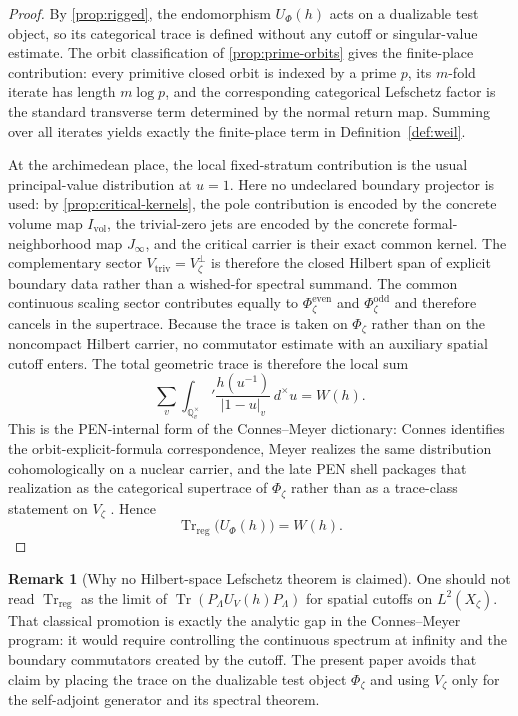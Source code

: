 \documentclass[11pt,a4paper]{article}
\theoremstyle{plain}
\theoremstyle{definition}
\newtheorem{remark}[theorem]{Remark}
\newcommand{\Q}{\mathbb{Q}}
\newcommand{\Tr}{\operatorname{Tr}}
\newcommand{\Trreg}{\operatorname{Tr}_{\mathrm{reg}}}
\newcommand{\triv}{\mathrm{triv}}
\newcommand{\dmu}{d^{\times}}
\begin{document}
\begin{proof}
By \cref{prop:rigged}, the endomorphism $U_{\Phi}(h)$ acts on a dualizable test object, so its categorical trace is defined without any cutoff or singular-value estimate. The orbit classification of \cref{prop:prime-orbits} gives the finite-place contribution: every primitive closed orbit is indexed by a prime $p$, its $m$-fold iterate has length $m\log p$, and the corresponding categorical Lefschetz factor is the standard transverse term determined by the normal return map. Summing over all iterates yields exactly the finite-place term in Definition~\ref{def:weil}.

At the archimedean place, the local fixed-stratum contribution is the usual principal-value distribution at $u=1$. Here no undeclared boundary projector is used: by \cref{prop:critical-kernels}, the pole contribution is encoded by the concrete volume map $I_{\mathrm{vol}}$, the trivial-zero jets are encoded by the concrete formal-neighborhood map $J_{\infty}$, and the critical carrier is their exact common kernel. The complementary sector $V_{\triv}=V_{\zeta}^{\perp}$ is therefore the closed Hilbert span of explicit boundary data rather than a wished-for spectral summand. The common continuous scaling sector contributes equally to $\Phi_{\zeta}^{\mathrm{even}}$ and $\Phi_{\zeta}^{\mathrm{odd}}$ and therefore cancels in the supertrace. Because the trace is taken on $\Phi_{\zeta}$ rather than on the noncompact Hilbert carrier, no commutator estimate with an auxiliary spatial cutoff enters. The total geometric trace is therefore the local sum
\[
  \sum_v\int_{\Q_v^{\times}}' \frac{h(u^{-1})}{|1-u|_v}\,\dmu u = W(h).
\]
This is the PEN-internal form of the Connes--Meyer dictionary: Connes identifies the orbit-explicit-formula correspondence, Meyer realizes the same distribution cohomologically on a nuclear carrier, and the late PEN shell packages that realization as the categorical supertrace of $\Phi_{\zeta}$ rather than as a trace-class statement on $V_{\zeta}$ \citep{connes-zeta,meyer-zeta,connes-weil,connes-consani-arch}. Hence
\[
  \Trreg\bigl(U_{\Phi}(h)\bigr)=W(h).
\]
\end{proof}

\begin{remark}[Why no Hilbert-space Lefschetz theorem is claimed]
One should not read $\Trreg$ as the limit of $\Tr(P_{\Lambda}U_V(h)P_{\Lambda})$ for spatial cutoffs on $L^2(X_{\zeta})$. That classical promotion is exactly the analytic gap in the Connes--Meyer program: it would require controlling the continuous spectrum at infinity and the boundary commutators created by the cutoff. The present paper avoids that claim by placing the trace on the dualizable test object $\Phi_{\zeta}$ and using $V_{\zeta}$ only for the self-adjoint generator and its spectral theorem.
\end{remark}
\end{document}
